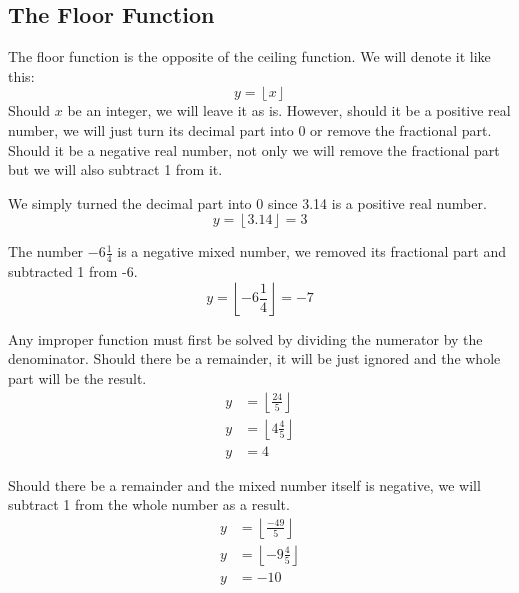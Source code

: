 \documentclass[letterpaper, twoside,12pt]{article}
\begin{document}
    \subsection{The Floor Function}
    The floor function is the opposite of the ceiling function. We will denote it like this:
    \begin{equation}
        y = \left\lfloor x \right\rfloor
    \end{equation}
    Should $x$ be an integer, we will leave it as is. However, should it be a positive real number, we will just turn its decimal part into 0 or remove the fractional part. Should it be a negative real number, not only we will remove the fractional part but we will also subtract 1 from it.

    We simply turned the decimal part into 0 since 3.14 is a positive real number.
    \begin{equation*}
        y = \left\lfloor 3.14 \right\rfloor = 3
    \end{equation*}

    The number $-6\frac{1}{4}$ is a negative mixed number, we removed its fractional part and subtracted 1 from -6.
    \begin{equation*}
        y = \left\lfloor -6\frac{1}{4} \right\rfloor = -7
    \end{equation*}

    Any improper function must first be solved by dividing the numerator by the denominator. Should there be a remainder, it will be just ignored and the whole part will be the result.
    \begin{equation*}
        \begin{split}
            y &= \left\lfloor \frac{24}{5} \right\rfloor \\
            y &= \left\lfloor 4\frac{4}{5} \right\rfloor \\
            y &= 4
        \end{split}
    \end{equation*}

    Should there be a remainder and the mixed number itself is negative, we will subtract 1 from the whole number as a result.
    \begin{equation*}
        \begin{split}
            y &= \left\lfloor \frac{-49}{5} \right\rfloor \\
            y &= \left\lfloor -9\frac{4}{5} \right\rfloor \\
            y &= -10
        \end{split}
    \end{equation*}
\end{document}
